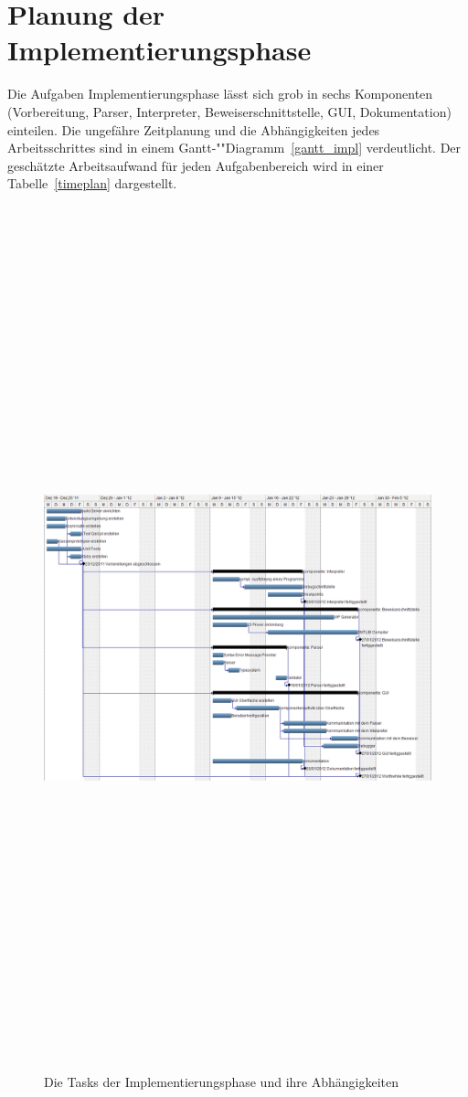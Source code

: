 \section{Planung der Implementierungsphase}

Die Aufgaben Implementierungsphase lässt sich grob in sechs Komponenten (Vorbereitung, Parser, Interpreter, Beweiserschnittstelle, GUI, Dokumentation) einteilen. Die ungefähre Zeitplanung und die Abhängigkeiten jedes Arbeitsschrittes sind in einem Gantt-""Diagramm~\ref{gantt_impl} verdeutlicht. Der geschätzte Arbeitsaufwand für jeden Aufgabenbereich wird in einer Tabelle~\ref{timeplan} dargestellt.

\begin{figure}
	\centering
	\hspace*{-2cm}\vspace*{-2cm}\caption[B]{Die Tasks der Implementierungsphase und ihre Abhängigkeiten}
	\hspace*{-3cm}\vspace*{-3cm}\includegraphics[angle=90,width=19cm,height= 25cm]{diagrams/gantt_implementierung_diag.png}

\end{figure}
